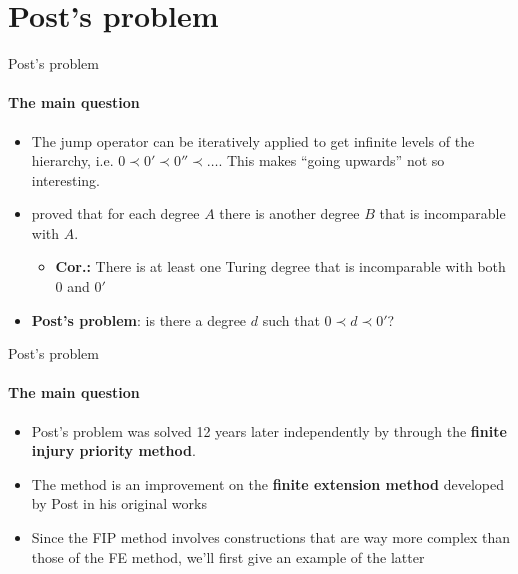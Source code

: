 \documentclass{beamer}
\newcommand{\curlyquotes}[1]{\textquotedblleft #1\textquotedblright}
\begin{document}
\section{Post's problem}

\begin{frame}{Post's problem}
\framesubtitle{The main question}
    \begin{itemize}[<+->]
        \item The jump operator can be iteratively applied to get infinite levels of the hierarchy, i.e. $0 \prec 0' \prec 0'' \prec \ldots$. This makes \curlyquotes{going upwards} not so interesting.
        \item \textcite{post_degrees} proved that for each degree $A$ there is another degree $B$ that is incomparable with $A$.
        \begin{itemize}
            \item \textbf{Cor.:} There is at least one Turing degree that is incomparable with both $0$ and $0'$ 
        \end{itemize}

        \item \textbf{Post's problem}: is there a degree $d$ such that $0 \prec d \prec 0'$?
    \end{itemize}
\end{frame}

\begin{frame}{Post's problem}
\framesubtitle{The main question}
    \begin{itemize}[<+->]
        \item Post's problem was solved 12 years later independently by \textcite{friedberg, muchnik} through the \textbf{finite injury priority method}.
        \item The method is an improvement on the \textbf{finite extension method} developed by Post in his original works
        \item Since the FIP method involves constructions that are way more complex than those of the FE method, we'll first give an example of the latter
    \end{itemize}
\end{frame}
\end{document}

